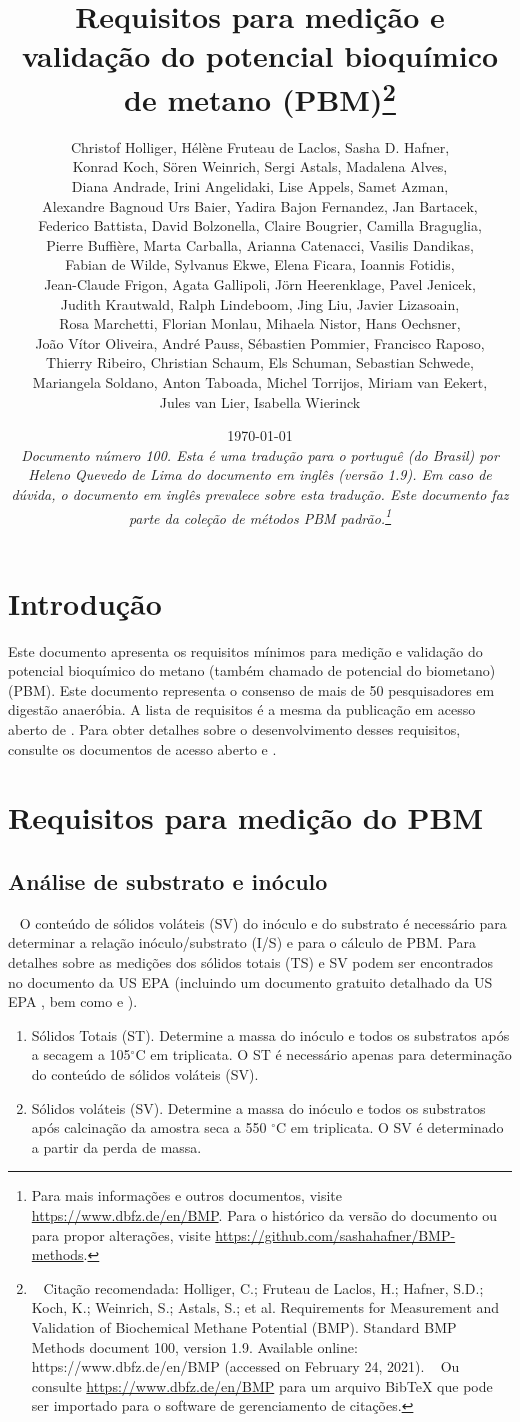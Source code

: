 \documentclass[]{article}
\title {Requisitos para medição e validação do potencial bioquímico de metano (PBM)\footnote{
  Citação recomendada: 
Holliger, C.; Fruteau de Laclos, H.; Hafner, S.D.; Koch, K.; Weinrich, S.; Astals, S.; et al. Requirements for Measurement and Validation of Biochemical Methane Potential (BMP). Standard BMP Methods document 100, version 1.9. Available online: https://www.dbfz.de/en/BMP (accessed on February 24, 2021).
\newline
  Ou consulte \url{https://www.dbfz.de/en/BMP} para um arquivo BibTeX que pode ser importado para o software de gerenciamento de citações.
}}
\author{
Christof Holliger, 
H{\'e}l{\`e}ne Fruteau de Laclos,
Sasha D. Hafner,\\
Konrad Koch,
S{\"o}ren Weinrich,
Sergi Astals, 
Madalena Alves, \\ 
Diana Andrade,
Irini Angelidaki,
Lise Appels, 
Samet Azman, \\
Alexandre Bagnoud
Urs Baier,
Yadira Bajon Fernandez,
Jan Bartacek,\\
Federico Battista,
David Bolzonella,
Claire Bougrier,
Camilla Braguglia, \\
Pierre Buffi{\`e}re,
Marta Carballa,
Arianna Catenacci,
Vasilis Dandikas, \\
Fabian de Wilde,
Sylvanus Ekwe,
Elena Ficara,
Ioannis Fotidis,\\
Jean-Claude Frigon,
Agata Gallipoli,
J{\"o}rn Heerenklage,
Pavel Jenicek,\\
Judith Krautwald,
Ralph Lindeboom,
Jing Liu,
Javier Lizasoain, \\
Rosa Marchetti,
Florian Monlau,
Mihaela Nistor,
Hans Oechsner,\\
Jo{\~a}o V{\'i}tor Oliveira,
Andr{\'e} Pauss,
S{\'e}bastien Pommier,
Francisco Raposo, \\
Thierry Ribeiro,
Christian Schaum,
Els Schuman,
Sebastian Schwede, \\
Mariangela Soldano,
Anton Taboada,
Michel Torrijos,
Miriam van Eekert,\\
Jules van Lier, 
Isabella Wierinck
}
\date{\today \\
\bigskip
\textit{
  Documento número 100.
  Esta é uma tradução para o portuguê (do Brasil) por Heleno Quevedo de Lima do documento em inglês (versão 1.9). Em caso de dúvida, o documento em inglês prevalece sobre esta tradução.
  Este documento faz parte da coleção de métodos PBM padrão.\footnote{
    Para mais informações e outros documentos, visite \url{https://www.dbfz.de/en/BMP}. 
    Para o histórico da versão do documento ou para propor alterações, visite \url{https://github.com/sashahafner/BMP-methods}.
  }
}
}
\begin{document}
\maketitle

\section{Introdução}
Este documento apresenta os requisitos mínimos para medição e validação do potencial bioquímico do metano (também chamado de potencial do biometano) (PBM). 
Este documento representa o consenso de mais de 50 pesquisadores em digestão anaeróbia. 
A lista de requisitos é a mesma da publicação em acesso aberto de \citet{holligerStandardizationBiomethanePotential2021}. 
Para obter detalhes sobre o desenvolvimento desses requisitos, consulte os documentos de acesso aberto \citet{holligerStandardizationBiomethanePotential2016} e \citet{hafnerImprovingInterlaboratoryReproducibility2020}.

\section{Requisitos para medição do PBM}
\label{sec:requirements}
\subsection{Análise de substrato e inóculo}
\label{sec:analysis}
  O conteúdo de sólidos voláteis (SV) do inóculo e do substrato é necessário para determinar a relação inóculo/substrato (I/S) e para o cálculo de PBM. Para detalhes sobre as medições dos sólidos totais (TS) e SV podem ser encontrados no documento da US EPA (incluindo um documento gratuito detalhado da US EPA \citep{epaMethod1684Total2001}, bem como \citet{strachDeterminationTotalSolids2020} e \citet{bairdStandardMethodsExamination2017}). 
 
\begin{enumerate}
    \item Sólidos Totais (ST). Determine a massa do inóculo e todos os substratos após a secagem a 105$^\circ$C em triplicata. O ST é necessário apenas para determinação do conteúdo de sólidos voláteis (SV).
    \item Sólidos voláteis (SV). Determine a massa do inóculo e todos os substratos após calcinação da amostra seca a 550 $^\circ$C em triplicata. O SV é determinado a partir da perda de massa.
\end{enumerate}
\end{document}
